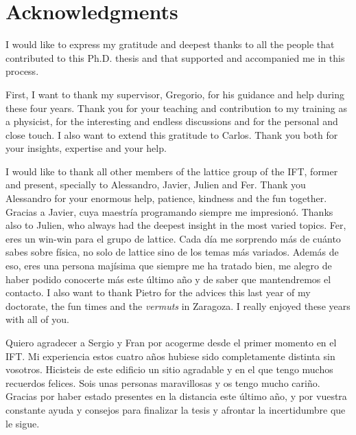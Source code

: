 
\bigskip

\begingroup
\let\clearpage\relax
\let\cleardoublepage\relax
\let\cleardoublepage\relax
\chapter*{Acknowledgments}

I would like to express my gratitude and deepest thanks to all the people that contributed to this Ph.D. thesis and that supported and accompanied me in this process.

First, I want to thank my supervisor, Gregorio, for his guidance and help during these four years. Thank you for your teaching and contribution to my training as a physicist, for the interesting and endless discussions and for the personal and close touch. I also want to extend this gratitude to Carlos. Thank you both for your insights, expertise and your help.

I would like to thank all other members of the lattice group of the IFT, former and present, specially to Alessandro, Javier, Julien and Fer. Thank you Alessandro for your enormous help, patience, kindness and the fun together. Gracias a Javier, cuya maestría programando siempre me impresionó. Thanks also to Julien, who always had the deepest insight in the most varied topics. Fer, eres un win-win para el grupo de lattice. Cada día me sorprendo más de cuánto sabes sobre física, no solo de lattice sino de los temas más variados. Además de eso, eres una persona majísima que siempre me ha tratado bien, me alegro de haber podido conocerte más este último año y de saber que mantendremos el contacto. I also want to thank Pietro for the advices this last year of my doctorate, the fun times and the \textit{vermuts} in Zaragoza. I really enjoyed these years with all of you.

Quiero agradecer a Sergio y Fran por acogerme desde el primer momento en el IFT. Mi experiencia estos cuatro años hubiese sido completamente distinta sin vosotros. Hicisteis de este edificio un sitio agradable y en el que tengo muchos recuerdos felices. Sois unas personas maravillosas y os tengo mucho cariño. Gracias por haber estado presentes en la distancia este último año, y por vuestra constante ayuda y consejos para finalizar la tesis y afrontar la incertidumbre que le sigue.

